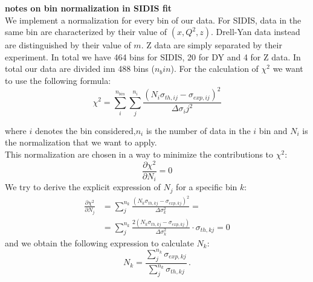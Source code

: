 \documentclass{article}
\begin{document}
\textbf{notes on bin normalization in SIDIS fit}\\
\newline
We implement a normalization for every bin of our data. For SIDIS, data in the same bin are characterized by their value of $(x,Q^2,z)$.
Drell-Yan data instead are distinguished by their value of $m$.
Z data are simply separated by their experiment.
In total we have 464 bins for SIDIS, 20 for DY and 4 for Z data. In total our data are divided inn 488 bins ($n_bin$).
For the calculation of $\chi^2$ we want to use the following formula:
\begin{equation}
\chi^2=\sum_i^{n_{bin}} \sum_j^{n_i} \frac{\left(N_i\sigma_{th,ij}-\sigma_{exp,ij}\right)^2}{\Delta\sigma_ij^2}
\end{equation}

where $i$ denotes the bin considered,$n_i$ is the number of data in the $i$ bin and $N_i$ is the normalization that we want to apply.\\
This normalization are chosen in a way to minimize the contributions to $\chi^2$:
\begin{equation}
\frac{\partial \chi^2}{\partial N_i} = 0 
\end{equation}
We try to derive the explicit expression of $N_j$ for a specific bin $k$:
\begin{align}
\frac{\partial \chi^2}{\partial N_j} &=  \sum_j^{n_k}\frac{\left(N_k\sigma_{th,kj}-\sigma_{exp,kj}\right)^2}{\Delta\sigma_k^2} = \\
 &=  \sum_j^{n_k} \frac{2\left( N_k\sigma_{th,kj}-\sigma_{exp,kj} \right)}{\Delta\sigma_k^2}\cdot \sigma_{th,kj} = 0
\end{align}
and we obtain the following expression to calculate $N_k$:
\begin{equation}
N_k= \frac{\sum_j^{n_k} \sigma_{exp,kj} }{\sum_j^{n_k} \sigma_{th,kj}}\,.
\end{equation}
\end{document}
